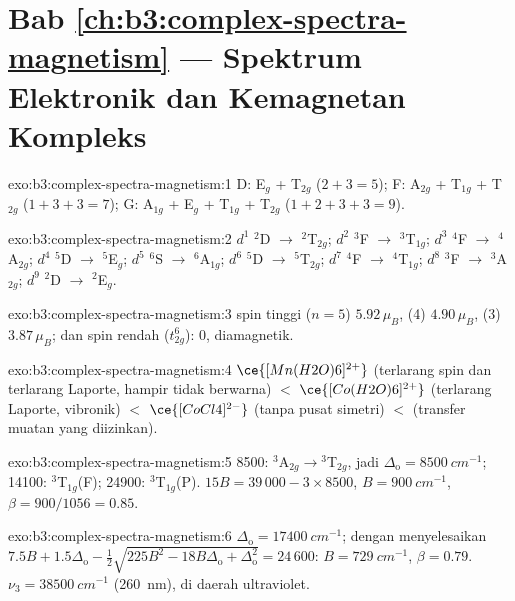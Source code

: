 \section*{Bab \ref{ch:b3:complex-spectra-magnetism} --- Spektrum Elektronik dan Kemagnetan Kompleks}

\begin{solution}{exo:b3:complex-spectra-magnetism:1}
D: E$_g$ + T$_{2g}$ ($2 + 3 = 5$); F: A$_{2g}$ + T$_{1g}$ + T$_{2g}$ ($1 + 3 + 3 = 7$); G: A$_{1g}$ + E$_g$ + T$_{1g}$ + T$_{2g}$
($1 + 2 + 3 + 3 = 9$).
\end{solution}

\begin{solution}{exo:b3:complex-spectra-magnetism:2}
$d^1$ $^2$D $\to$ $^2$T$_{2g}$; $d^2$ $^3$F $\to$ $^3$T$_{1g}$; $d^3$ $^4$F $\to$ $^4$A$_{2g}$; $d^4$ $^5$D $\to$ $^5$E$_g$; $d^5$ $^6$S $\to$ $^6$A$_{1g}$; $d^6$ $^5$D
$\to$ $^5$T$_{2g}$; $d^7$ $^4$F $\to$ $^4$T$_{1g}$; $d^8$ $^3$F $\to$ $^3$A$_{2g}$; $d^9$ $^2$D $\to$ $^2$E$_g$.
\end{solution}

\begin{solution}{exo:b3:complex-spectra-magnetism:3}
 spin tinggi ($n = 5$) $5.92\,\mu_B$,  (4) $4.90\,\mu_B$,  (3) $3.87\,\mu_B$;  dan
 spin rendah ($t_{2g}^6$): 0, diamagnetik.
\end{solution}

\begin{solution}{exo:b3:complex-spectra-magnetism:4}
$\ce{[Mn(H2O)6]^{2+}}$ (terlarang spin dan terlarang Laporte, hampir tidak berwarna) $<$ $\ce{[Co(H2O)6]^{2+}}$
(terlarang Laporte, vibronik) $<$ $\ce{[CoCl4]^{2-}}$ (tanpa pusat simetri) $<$  (transfer
muatan yang diizinkan).
\end{solution}

\begin{solution}{exo:b3:complex-spectra-magnetism:5}
8500: $^3$A$_{2g}\to{}^3$T$_{2g}$, jadi $\Delta_{\mathrm o} = \qty{8500}{cm^{-1}}$; 14100: $^3$T$_{1g}$(F); 24900: $^3$T$_{1g}$(P).
$15B = 39\,000 - 3 \times 8500$, $B = \qty{900}{cm^{-1}}$, $\beta = 900/1056 = 0.85$.
\end{solution}

\begin{solution}{exo:b3:complex-spectra-magnetism:6}
$\Delta_{\mathrm o} = \qty{17400}{cm^{-1}}$; dengan menyelesaikan $7.5B + 1.5\Delta_{\mathrm o} - \frac12\sqrt{225B^2 - 18B\Delta_{\mathrm o} + \Delta_{\mathrm o}^2} = 24\,600$: $B = \qty{729}{cm^{-1}}$,
$\beta = 0.79$. $\nu_3 = \qty{38500}{cm^{-1}}$ (\qty{260}{nm}), di daerah ultraviolet.
\end{solution}

